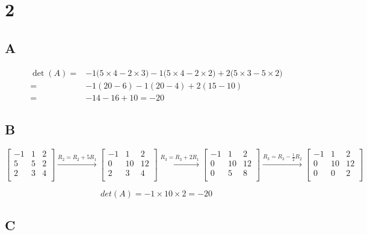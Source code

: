 \documentclass{article}
\begin{document}
\section*{2}

\subsection*{A}

\[
	\begin{aligned}
		\det(A) = & -1\bigl(5 \times 4 - 2 \times 3\bigr) - 1\bigl(5 \times 4 - 2 \times 2\bigr) + 2\bigl(5 \times 3 - 5 \times 2\bigr) \\
		=         & -1(20 - 6) - 1(20 - 4) + 2(15 - 10)                                                                                 \\
		=         & -14 - 16 + 10 = -20
	\end{aligned}
\]

\subsection*{B}

\[
	\begin{bmatrix}
		-1 & 1 & 2 \\
		5  & 5 & 2 \\
		2  & 3 & 4 \\
	\end{bmatrix}
	\xrightarrow{R_2 = R_2 + 5 R_1}
	\begin{bmatrix}
		-1 & 1  & 2  \\
		0  & 10 & 12 \\
		2  & 3  & 4  \\
	\end{bmatrix}
	\xrightarrow{R_3 = R_3 + 2 R_1}
	\begin{bmatrix}
		-1 & 1  & 2  \\
		0  & 10 & 12 \\
		0  & 5  & 8  \\
	\end{bmatrix}
	\xrightarrow{R_3 = R_3 - \frac{1}{2} R_2}
	\begin{bmatrix}
		-1 & 1  & 2  \\
		0  & 10 & 12 \\
		0  & 0  & 2  \\
	\end{bmatrix}
\]

\[
	det(A) = -1 \times 10 \times 2 = -20
\]

\subsection*{C}
\end{document}

